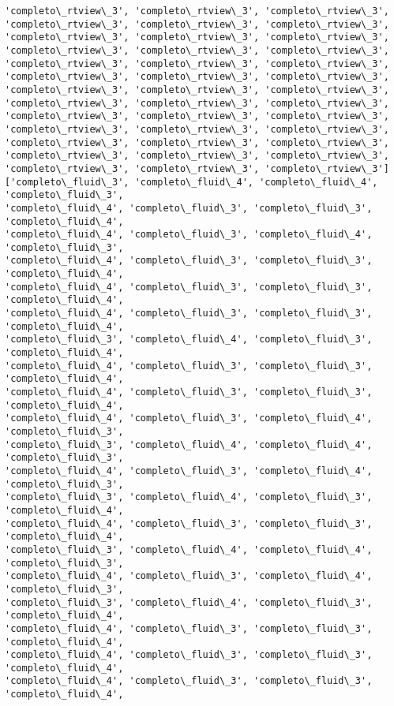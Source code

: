 \documentclass[11pt]{article}
\begin{document}
\begin{Verbatim}[commandchars=\\\{\}]
'completo\_rtview\_3', 'completo\_rtview\_3', 'completo\_rtview\_3',
'completo\_rtview\_3', 'completo\_rtview\_3', 'completo\_rtview\_3',
'completo\_rtview\_3', 'completo\_rtview\_3', 'completo\_rtview\_3',
'completo\_rtview\_3', 'completo\_rtview\_3', 'completo\_rtview\_3',
'completo\_rtview\_3', 'completo\_rtview\_3', 'completo\_rtview\_3',
'completo\_rtview\_3', 'completo\_rtview\_3', 'completo\_rtview\_3',
'completo\_rtview\_3', 'completo\_rtview\_3', 'completo\_rtview\_3',
'completo\_rtview\_3', 'completo\_rtview\_3', 'completo\_rtview\_3',
'completo\_rtview\_3', 'completo\_rtview\_3', 'completo\_rtview\_3',
'completo\_rtview\_3', 'completo\_rtview\_3', 'completo\_rtview\_3',
'completo\_rtview\_3', 'completo\_rtview\_3', 'completo\_rtview\_3',
'completo\_rtview\_3', 'completo\_rtview\_3', 'completo\_rtview\_3',
'completo\_rtview\_3', 'completo\_rtview\_3', 'completo\_rtview\_3']
['completo\_fluid\_3', 'completo\_fluid\_4', 'completo\_fluid\_4', 'completo\_fluid\_3',
'completo\_fluid\_4', 'completo\_fluid\_3', 'completo\_fluid\_3', 'completo\_fluid\_4',
'completo\_fluid\_4', 'completo\_fluid\_3', 'completo\_fluid\_4', 'completo\_fluid\_3',
'completo\_fluid\_4', 'completo\_fluid\_3', 'completo\_fluid\_3', 'completo\_fluid\_4',
'completo\_fluid\_4', 'completo\_fluid\_3', 'completo\_fluid\_3', 'completo\_fluid\_4',
'completo\_fluid\_4', 'completo\_fluid\_3', 'completo\_fluid\_3', 'completo\_fluid\_4',
'completo\_fluid\_3', 'completo\_fluid\_4', 'completo\_fluid\_3', 'completo\_fluid\_4',
'completo\_fluid\_4', 'completo\_fluid\_3', 'completo\_fluid\_3', 'completo\_fluid\_4',
'completo\_fluid\_4', 'completo\_fluid\_3', 'completo\_fluid\_3', 'completo\_fluid\_4',
'completo\_fluid\_4', 'completo\_fluid\_3', 'completo\_fluid\_4', 'completo\_fluid\_3',
'completo\_fluid\_3', 'completo\_fluid\_4', 'completo\_fluid\_4', 'completo\_fluid\_3',
'completo\_fluid\_4', 'completo\_fluid\_3', 'completo\_fluid\_4', 'completo\_fluid\_3',
'completo\_fluid\_3', 'completo\_fluid\_4', 'completo\_fluid\_3', 'completo\_fluid\_4',
'completo\_fluid\_4', 'completo\_fluid\_3', 'completo\_fluid\_3', 'completo\_fluid\_4',
'completo\_fluid\_3', 'completo\_fluid\_4', 'completo\_fluid\_4', 'completo\_fluid\_3',
'completo\_fluid\_4', 'completo\_fluid\_3', 'completo\_fluid\_4', 'completo\_fluid\_3',
'completo\_fluid\_3', 'completo\_fluid\_4', 'completo\_fluid\_3', 'completo\_fluid\_4',
'completo\_fluid\_4', 'completo\_fluid\_3', 'completo\_fluid\_3', 'completo\_fluid\_4',
'completo\_fluid\_4', 'completo\_fluid\_3', 'completo\_fluid\_3', 'completo\_fluid\_4',
'completo\_fluid\_4', 'completo\_fluid\_3', 'completo\_fluid\_3', 'completo\_fluid\_4',

\end{Verbatim}
\end{document}
